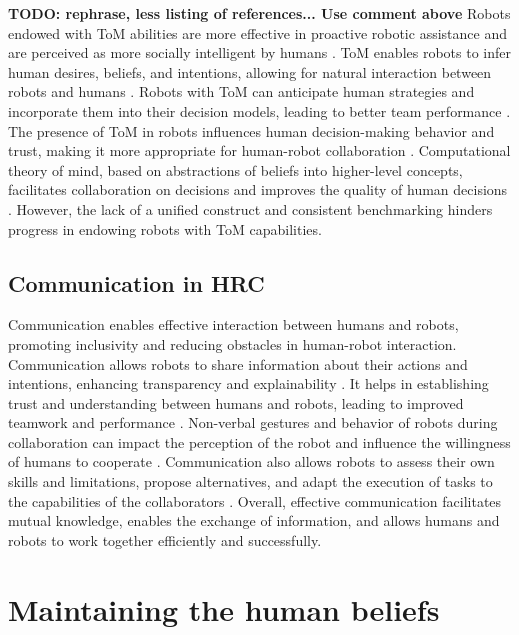     \textbf{TODO: rephrase, less listing of references... Use comment above} 
    Robots endowed with ToM abilities are more effective in proactive robotic assistance and are perceived as more socially intelligent by humans \cite{shvo_proactive_2022}. ToM enables robots to infer human desires, beliefs, and intentions, allowing for natural interaction between robots and humans \cite{yu_robot_2023}. Robots with ToM can anticipate human strategies and incorporate them into their decision models, leading to better team performance \cite{romeo_exploring_2022}. The presence of ToM in robots influences human decision-making behavior and trust, making it more appropriate for human-robot collaboration \cite{schlobach_abstracting_2022}. Computational theory of mind, based on abstractions of beliefs into higher-level concepts, facilitates collaboration on decisions and improves the quality of human decisions \cite{gurney_robots_2022}. However, the lack of a unified construct and consistent benchmarking hinders progress in endowing robots with ToM capabilities.


    
    \subsection{Communication in HRC}

    Communication enables effective interaction between humans and robots, promoting inclusivity and reducing obstacles in human-robot interaction. Communication allows robots to share information about their actions and intentions, enhancing transparency and explainability \cite{mcmillan_human-robot_2023}. It helps in establishing trust and understanding between humans and robots, leading to improved teamwork and performance \cite{verhagen_influence_2022}. Non-verbal gestures and behavior of robots during collaboration can impact the perception of the robot and influence the willingness of humans to cooperate \cite{arntz_collaborating_2022}. Communication also allows robots to assess their own skills and limitations, propose alternatives, and adapt the execution of tasks to the capabilities of the collaborators \cite{ferrari_bidirectional_2022}. Overall, effective communication facilitates mutual knowledge, enables the exchange of information, and allows humans and robots to work together efficiently and successfully.


\section{Maintaining the human beliefs}

